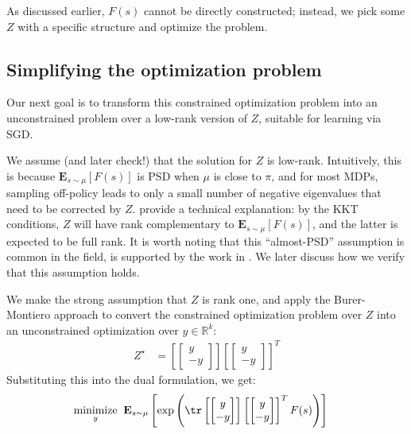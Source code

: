 \documentclass[11pt]{article}
\newcommand{\E}{\textbf{E}}
\begin{document}
As discussed earlier, $F(s)$ cannot be directly constructed; instead, we pick some $Z$ with a specific structure and optimize the problem.


\subsection{Simplifying the optimization problem}

Our next goal is to transform this constrained optimization problem into an unconstrained problem over a low-rank version of $Z$, suitable for learning via SGD.

We assume (and later check!) that the solution for $Z$ is low-rank. Intuitively, this is because $\E_{s\sim\mu}[F(s)]$ is PSD when $\mu$ is close to $\pi$, and for most MDPs, sampling off-policy leads to only a small number of negative eigenvalues that need to be corrected by $Z$. \citet{kolter2011fixed} provide a technical explanation: by the KKT conditions, $Z$ will have rank complementary to $\E_{s\sim\mu}[F(s)]$, and the latter is expected to be full rank. It is worth noting that this ``almost-PSD'' assumption is common in the field, is supported by the work in \cite{manek2022pitfalls}. We later discuss how we verify that this assumption holds.

We make the strong assumption that $Z$ is rank one, and apply the Burer-Montiero  approach to convert the constrained optimization problem over $Z$ into an unconstrained optimization over $y\in \mathbb R^{k}$:
\begin{align}
  Z^\star & = \left [ \begin{bmatrix} y \\ -y \end{bmatrix} \right ] \left [ \begin{bmatrix} y \\ -y\end{bmatrix} \right ]^T
\end{align}
Substituting this into the dual formulation, we get:
\begin{align}
\underset{y}{\text{minimize}} & \;\; \mathbf{E}_{s\sim\mu} \left [ \exp\left (\tr  \left [ \begin{bmatrix} y \\ -y \end{bmatrix} \right ] \left [ \begin{bmatrix} y \\ -y\end{bmatrix} \right ]^T F(s) \right )  \right ]
\end{align}
\end{document}
